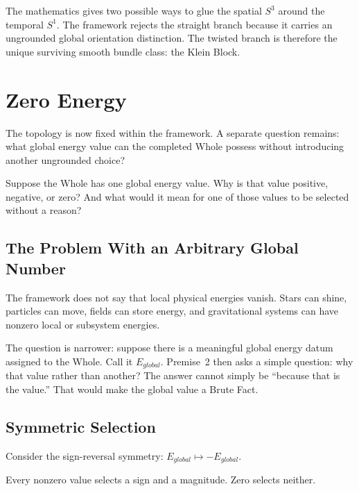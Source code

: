 \documentclass[11pt]{article}
\theoremstyle{canonstyle}
\def\mathrm#1{#1}%
\begin{document}
\begin{plainwords}
The mathematics gives two possible ways to glue the spatial $S^3$ around the temporal $S^1$. The framework rejects the straight branch because it carries an ungrounded global orientation distinction. The twisted branch is therefore the unique surviving smooth bundle class: the Klein Block.
\end{plainwords}

\newpage
\section{Zero Energy}

The topology is now fixed within the framework. A separate question remains: what global energy value can the completed Whole possess without introducing another ungrounded choice?

\begin{reflect}
Suppose the Whole has one global energy value. Why is that value positive, negative, or zero? And what would it mean for one of those values to be selected without a reason?
\end{reflect}

\subsection{The Problem With an Arbitrary Global Number}

The framework does not say that local physical energies vanish. Stars can shine, particles can move, fields can store energy, and gravitational systems can have nonzero local or subsystem energies.

The question is narrower: suppose there is a meaningful global energy datum assigned to the Whole. Call it $E_{\mathrm{global}}$. Premise~2 then asks a simple question: why that value rather than another? The answer cannot simply be ``because that is the value.'' That would make the global value a Brute Fact.

\subsection{Symmetric Selection}

Consider the sign-reversal symmetry: $E_{\mathrm{global}} \mapsto -E_{\mathrm{global}}$.

Every nonzero value selects a sign and a magnitude. Zero selects neither.
\end{document}
